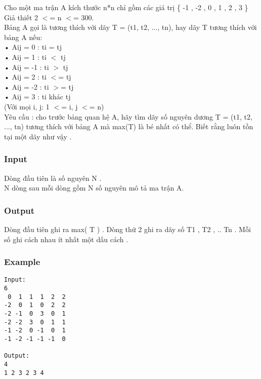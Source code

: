 



   Cho một ma trận A kích thước n*n chỉ gồm các giá trị \{ -1 , -2 , 0 , 1 , 2 , 3 \}   
\\   Giả thiết 2 $<$= n $<$= 300.   
\\   Bảng A gọi là tương thích với dãy T = (t1, t2, ..., tn), hay dãy T tương thích với bảng A nếu:   
\\   • Aij = 0  :   ti = tj   
\\   • Aij = 1  :   ti $<$ tj   
\\   • Aij = -1 :   ti $>$ tj   
\\   • Aij = 2  :  ti $<$= tj   
\\   • Aij = -2 :   ti $>$= tj   
\\   • Aij = 3  :   ti khác tj   
\\   (Với mọi i, j: 1 $<$= i, j $<$= n)   
\\   Yêu cầu : cho trước bảng quan hệ A, hãy tìm dãy số nguyên dương T = (t1, t2, ..., tn) tương thích với bảng A mà max(T) là bé nhất có thể. Biết rằng luôn tồn tại một dãy như vậy .  

\subsubsection{   Input  }

   Dòng đầu tiên là số nguyên N .   
\\   N dòng sau mỗi dòng gồm N số nguyên mô tả ma trận A.  

\subsubsection{   Output  }

   Dòng đầu tiên ghi ra max( T ) . Dòng thứ 2 ghi ra dãy số T1 , T2 , .. Tn . Mỗi số ghi cách nhau ít nhất một dấu cách .  

\subsubsection{   Example  }
\begin{verbatim}
Input:
6
 0  1  1  1  2  2
-2  0  1  0  2  2
-2 -1  0  3  0  1
-2 -2  3  0  1  1
-1 -2  0 -1  0  1
-1 -2 -1 -1 -1  0

Output:
4
1 2 3 2 3 4 
\end{verbatim}